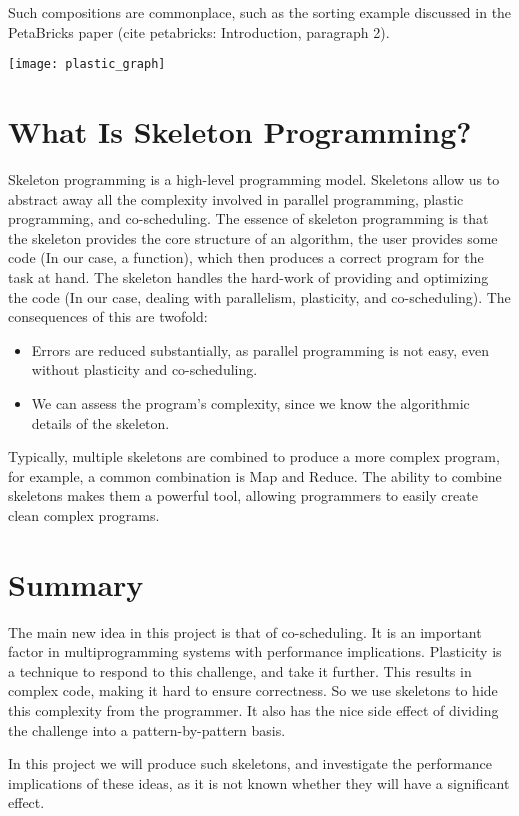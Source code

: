 Such compositions are commonplace, such as the sorting example discussed in the PetaBricks paper (cite petabricks: Introduction, paragraph 2).

\begin{center}
	\texttt{[image: plastic\_graph]}
\end{center}

\section{What Is Skeleton Programming?}

Skeleton programming is a high-level programming model. Skeletons allow us to abstract away all the complexity involved in parallel programming, plastic programming, and co-scheduling. The essence of skeleton programming is that the skeleton provides the core structure of an algorithm, the user provides some code (In our case, a function), which then produces a correct program for the task at hand. The skeleton handles the hard-work of providing and optimizing the code (In our case, dealing with parallelism, plasticity, and co-scheduling). The consequences of this are twofold:

\begin{itemize}
	\item Errors are reduced substantially, as parallel programming is not easy, even without plasticity and co-scheduling.
	\item We can assess the program's complexity, since we know the algorithmic details of the skeleton.
\end{itemize}

Typically, multiple skeletons are combined to produce a more complex program, for example, a common combination is Map and Reduce. The ability to combine skeletons makes them a powerful tool, allowing programmers to easily create clean complex programs.

\section{Summary}

The main new idea in this project is that of co-scheduling. It is an important factor in multiprogramming systems with performance implications. Plasticity is a technique to respond to this challenge, and take it further. This results in complex code, making it hard to ensure correctness. So we use skeletons to hide this complexity from the programmer. It also has the nice side effect of dividing the challenge into a pattern-by-pattern basis.

In this project we will produce such skeletons, and investigate the performance implications of these ideas, as it is not known whether they will have a significant effect.